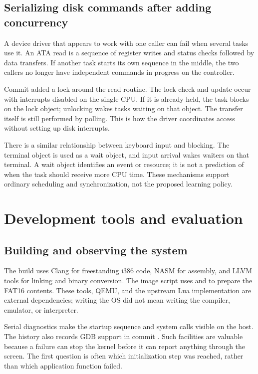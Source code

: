 \documentclass[11pt,a4paper]{scrartcl}
\newcommand{\code}[1]{\texttt{\detokenize{#1}}}
\begin{document}
\subsection{Serializing disk commands after adding concurrency}

A device driver that appears to work with one caller can fail when several
tasks use it. An ATA read is a sequence of register writes and status
checks followed by data transfers. If another task starts its own sequence
in the middle, the two callers no longer have independent commands in
progress on the controller.

Commit \code{2485a32} added a lock around the read routine. The lock check
and update occur with interrupts disabled on the single CPU. If it is
already held, the task blocks on the lock object; unlocking wakes tasks
waiting on that object. The transfer itself is still performed by polling.
This is how the driver coordinates access without setting up disk interrupts.

There is a similar relationship between keyboard input and blocking.
The terminal object is used as a wait object, and input arrival wakes
waiters on that terminal. A wait object identifies an event or resource;
it is not a prediction of when the task should receive more CPU time.
These mechanisms support ordinary scheduling and synchronization, not
the proposed learning policy.

\section{Development tools and evaluation}
\label{sec:evaluation}

\subsection{Building and observing the system}

The build uses Clang for freestanding i386 code, NASM for assembly, and
LLVM tools for linking and binary conversion. The image script uses
\code{mkfs.fat} and \code{mcopy} to prepare the FAT16 contents. These tools,
QEMU, and the upstream Lua implementation are external dependencies;
writing the OS did not mean writing the compiler, emulator, or interpreter.

Serial diagnostics make the startup sequence and system calls visible on
the host. The history also records GDB support in commit \code{0004ae8}.
Such facilities are valuable because a failure can stop the kernel before
it can report anything through the screen. The first question is often
which initialization step was reached, rather than which application
function failed.
\end{document}
